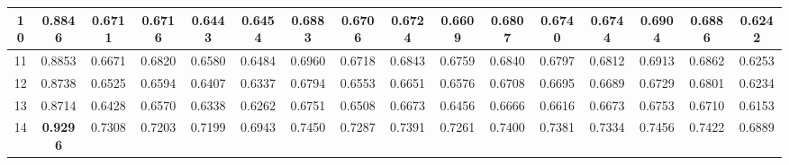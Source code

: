 \documentclass[12pt]{jarticle}
\begin{document}
\begin{table}[t]
{\begin{tabular}{|c|c|c|c|c|c|c|c|c|c|c|c|c|c|c|c|}
      \multicolumn{1}{|c|}{10} & 0.8846 & 0.6711 & 0.6716 & 0.6443 & 0.6454 & 0.6883 & 0.6706 & 0.6724 & 0.6609 & 0.6807 & 0.6740 & 0.6744 & 0.6904 & 0.6886 & 0.6242 \\ \hline
      \multicolumn{1}{|c|}{11} & 0.8853 & 0.6671 & 0.6820 & 0.6580 & 0.6484 & 0.6960 & 0.6718 & 0.6843 & 0.6759 & 0.6840 & 0.6797 & 0.6812 & 0.6913 & 0.6862 & 0.6253 \\ \hline
      \multicolumn{1}{|c|}{12} & 0.8738 & 0.6525 & 0.6594 & 0.6407 & 0.6337 & 0.6794 & 0.6553 & 0.6651 & 0.6576 & 0.6708 & 0.6695 & 0.6689 & 0.6729 & 0.6801 & 0.6234 \\ \hline
      \multicolumn{1}{|c|}{13} & 0.8714 & 0.6428 & 0.6570 & 0.6338 & 0.6262 & 0.6751 & 0.6508 & 0.6673 & 0.6456 & 0.6666 & 0.6616 & 0.6673 & 0.6753 & 0.6710 & 0.6153 \\ \hline
      \multicolumn{1}{|c|}{14} & \textbf{0.9296} & 0.7308 & 0.7203 & 0.7199 & 0.6943 & 0.7450 & 0.7287 & 0.7391 & 0.7261 & 0.7400 & 0.7381 & 0.7334 & 0.7456 & 0.7422 & 0.6889 \\ \hline
      \end{tabular}
  }
    \end{table}
\end{document}
